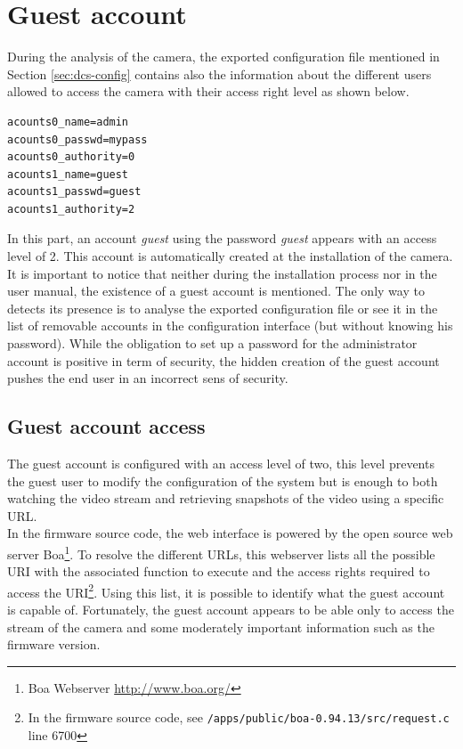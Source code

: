 \section{Guest account}
\label{sec:dcs-guest}

During the analysis of the camera, the exported configuration file mentioned in Section \ref{sec:dcs-config} contains also the information about the different users allowed to access the camera with their access right level as shown below.

{\scriptsize
\begin{verbatim}
acounts0_name=admin
acounts0_passwd=mypass
acounts0_authority=0
acounts1_name=guest
acounts1_passwd=guest
acounts1_authority=2
\end{verbatim}
}

In this part, an account \emph{guest} using the password \emph{guest} appears with an access level of 2.
This account is automatically created at the installation of the camera.\\

It is important to notice that neither during the installation process nor in the user manual, the existence of a guest account is mentioned.
The only way to detects its presence is to analyse the exported configuration file or see it in the list of removable accounts in the configuration interface (but without knowing his password).
While the obligation to set up a password for the administrator account is positive in term of security, the hidden creation of the guest account pushes the end user in an incorrect sens of security.

\subsection{Guest account access}
\label{sec:dcs-guest-rights}

The guest account is configured with an access level of two, this level prevents the guest user to modify the configuration of the system but is enough to both watching the video stream and retrieving snapshots of the video using a specific URL.\\

In the firmware source code, the web interface is powered by the open source web server Boa\footnote{Boa Webserver \url{http://www.boa.org/}}.
To resolve the different URLs, this webserver lists all the possible URI with the associated function to execute and the access rights required to access the URI\footnote{In the firmware source code, see \texttt{/apps/public/boa-0.94.13/src/request.c} line 6700}.
Using this list, it is possible to identify what the guest account is capable of.
Fortunately, the guest account appears to be able only to access the stream of the camera and some moderately important information such as the firmware version.

